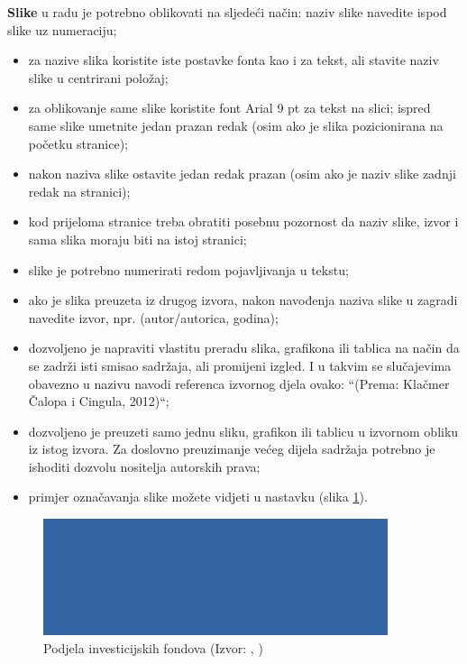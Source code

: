 \documentclass{foi}
\begin{document}
\begin{flushleft}\textbf{Slike} u radu je potrebno oblikovati na sljedeći način:
naziv slike navedite ispod slike uz numeraciju;\end{flushleft}

\begin{itemize}
    \item za nazive slika koristite iste postavke fonta kao i za tekst, ali stavite naziv slike u centrirani položaj;

    \item za oblikovanje same slike koristite font Arial 9 pt za tekst na slici;
ispred same slike umetnite jedan prazan redak (osim ako je slika pozicionirana na početku stranice);

    \item nakon naziva slike ostavite jedan redak prazan (osim ako je naziv slike zadnji redak na stranici);

    \item kod prijeloma stranice treba obratiti posebnu pozornost da naziv slike, izvor i sama slika moraju biti na istoj stranici; 

    \item slike je potrebno numerirati redom pojavljivanja u tekstu;

    \item ako je slika preuzeta iz drugog izvora, nakon navođenja naziva slike u zagradi navedite izvor, npr. (autor/autorica, godina);

    \item dozvoljeno je napraviti vlastitu preradu slika, grafikona ili tablica na način da se zadrži isti smisao sadržaja, ali promijeni izgled. I u takvim se slučajevima obavezno u nazivu navodi referenca izvornog djela ovako: “(Prema: Klačmer Čalopa i Cingula, 2012)“;

    \item dozvoljeno je preuzeti samo jednu sliku, grafikon ili tablicu u izvornom obliku iz istog izvora. Za doslovno preuzimanje većeg dijela sadržaja potrebno je ishoditi dozvolu nositelja autorskih prava;

    \item primjer označavanja slike možete vidjeti u nastavku (slika \ref{fig:podjela}).
\end{itemize}

\begin{figure}[h!]
    \centering
    \includegraphics[width=0.9\textwidth]{slike/slika.png}
    \caption{Podjela investicijskih fondova (Izvor: \citeauthor{Aranda2009}, \citeyear{Aranda2009})}
    \label{fig:podjela}
\end{figure}
\end{document}
